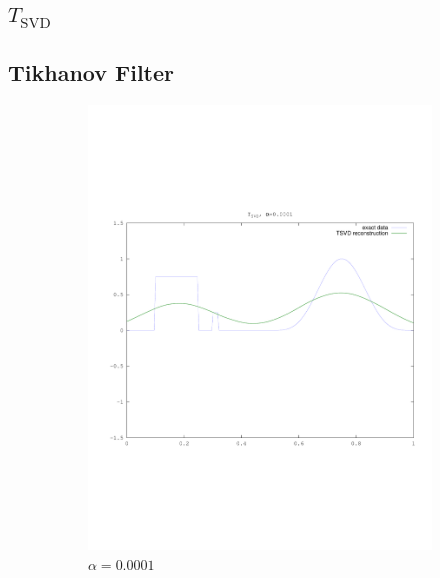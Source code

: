 \documentclass{article}
\begin{document}
\subsection{$T_{\text{SVD}}$}



\subsection{Tikhanov Filter}

\begin{figure}
        \centering
        \begin{subfigure}[b]{0.3\textwidth}
                \includegraphics[width=\textwidth]{plots/tsvd0001.pdf}
                \caption{$\alpha=0.0001$}
        \end{subfigure}%
        \begin{subfigure}[b]{0.3\textwidth}

\end{subfigure}
\end{figure}
\end{document}
